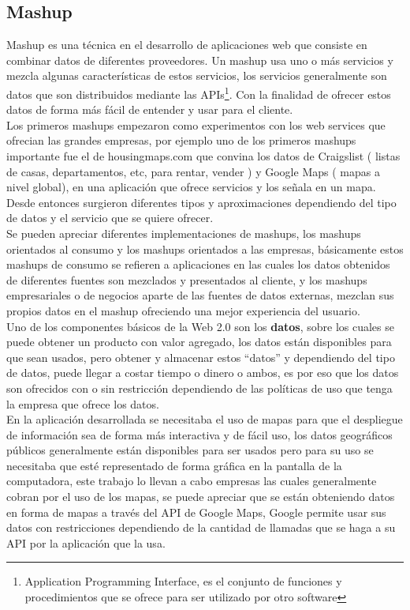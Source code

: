     \subsection{Mashup} %
    \label{sub:mashup}
      Mashup es una técnica en el desarrollo de aplicaciones web que consiste en combinar datos de diferentes proveedores. Un mashup usa uno o más servicios y mezcla algunas características de estos servicios, los servicios generalmente son datos que son distribuidos mediante las APIs\footnote{Application Programming Interface, es el conjunto de funciones y procedimientos que se ofrece para ser utilizado por otro software}. Con la finalidad de ofrecer estos datos de forma más fácil de entender y usar para el cliente.\\

      Los primeros mashups empezaron como experimentos con los web services que ofrecian las grandes empresas, por ejemplo uno de los primeros mashups importante fue el de housingmaps.com  que convina los datos de Craigslist ( listas de casas, departamentos, etc, para rentar, vender ) y Google Maps ( mapas a nivel global), en una aplicaci\'on que ofrece servicios y los se\~nala en un mapa. Desde entonces surgieron diferentes tipos y aproximaciones dependiendo del tipo de datos y el servicio que se quiere ofrecer.\cite{web8}\\

      Se pueden apreciar diferentes implementaciones de mashups, los mashups orientados al consumo y los mashups orientados a las empresas, básicamente estos mashups de consumo se refieren a aplicaciones en las cuales los datos obtenidos de diferentes fuentes son mezclados y presentados al cliente, y los mashups empresariales o de negocios aparte de las fuentes de datos externas, mezclan sus propios datos en el mashup ofreciendo una mejor experiencia del usuario.\\

      Uno de los componentes básicos de la Web 2.0 son los \textbf{datos}, sobre los cuales se puede obtener un producto con valor agregado, los datos están disponibles para que sean usados, pero obtener y almacenar estos ``datos''  y dependiendo del tipo de datos, puede llegar a costar tiempo o dinero o ambos, es por eso que los datos son ofrecidos con o sin restricción dependiendo de las políticas de uso que tenga la empresa que ofrece los datos.\\

      En la aplicación desarrollada se necesitaba el uso de mapas para que el despliegue de información sea de forma más interactiva y de fácil uso, los datos geográficos públicos generalmente están disponibles para ser usados pero para su uso se necesitaba que esté representado de forma gráfica en la pantalla de la computadora, este trabajo lo llevan a cabo empresas las cuales generalmente cobran por el uso de los mapas, se puede  apreciar que se están obteniendo datos en forma de mapas a través del API de Google Maps, Google permite usar sus datos con restricciones dependiendo de la cantidad de llamadas que se haga a su API por la aplicación que la usa.\\

